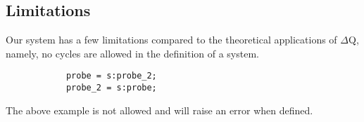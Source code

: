             
        \subsection{Limitations}
            Our system has a few limitations compared to the theoretical applications of $\Delta$Q, namely, no cycles are allowed in the definition of a system.
        
        \begin{verbatim}
            probe = s:probe_2;
            probe_2 = s:probe;
        \end{verbatim}
        The above example is not allowed and will raise an error when defined.  


